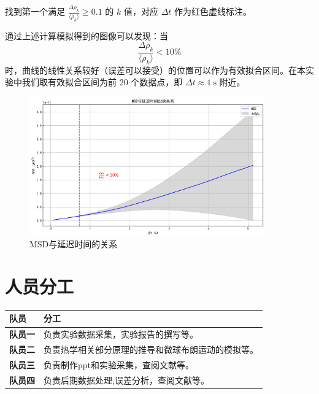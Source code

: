 \documentclass[a4paper]{report} %
\begin{document}
找到第一个满足 $\frac{\Delta \rho_k}{\langle \rho_k \rangle} \geq 0.1$ 的 $k$ 值，对应 $\Delta t$ 作为红色虚线标注。

通过上述计算模拟得到的图像可以发现：当 
\[
\frac{\Delta \rho_k}{\langle \rho_k \rangle} < 10\%
\]
时，曲线的线性关系较好（误差可以接受）的位置可以作为有效拟合区间。在本实验中我们取有效拟合区间为前 20 个数据点，即 $\Delta t \approx 1 \ \text{s}$ 附近。

\begin{figure}[H]
    \centering
    \includegraphics[width=0.9\textwidth]{取1.jpg}
    \caption{MSD与延迟时间的关系}
    \label{fig:let1}
\end{figure}

\section{人员分工}
\renewcommand{\arraystretch}{1.3} %

\begin{tabularx}{\textwidth}{>{\bfseries}l X}
\toprule
队员 & 分工 \\
\midrule
队员一 & 负责实验数据采集，实验报告的撰写等。 \\
队员二 & 负责热学相关部分原理的推导和微球布朗运动的模拟等。 \\
队员三 & 负责制作ppt和实验采集，查阅文献等。 \\
队员四 & 负责后期数据处理,误差分析，查阅文献等。 \\
\bottomrule
\end{tabularx}
\end{document}
